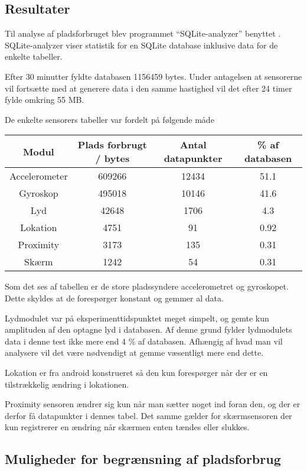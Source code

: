 \subsection{Resultater}
Til analyse af pladsforbruget blev programmet ``SQLite-analyzer'' benyttet \cite{sqliteanalyzer}.
SQLite-analyzer viser statistik for en SQLite database inklusive data for de enkelte tabeller.

Efter 30 minutter fyldte databasen 1156459 bytes.
Under antagelsen at sensorerne vil fortsætte med at generere data i den samme hastighed vil det efter 24 timer fylde omkring 55 MB. 

De enkelte sensorers tabeller var fordelt på følgende måde

\begin{tabular}{|c|c|c|c|}
	\hline Modul & Plads forbrugt / bytes & Antal datapunkter & \% af databasen \\
	\hline Accelerometer & 609266 & 12434 & 51.1 \\ 
	\hline Gyroskop & 495018 & 10146 & 41.6\\ 
	\hline Lyd & 42648 & 1706 & 4.3 \\ 
	\hline Lokation & 4751 & 91 & 0.92 \\ 
	\hline Proximity & 3173 & 135 & 0.31 \\ 
	\hline Skærm & 1242 & 54 & 0.31 \\ 
	\hline 
\end{tabular} 

Som det ses af tabellen er de store pladssyndere accelerometret og gyroskopet.
Dette skyldes at de forespørger konstant og gemmer al data.

Lydmodulet var på eksperimenttidspunktet meget simpelt, og gemte kun amplituden af den optagne lyd i databasen. 
Af denne grund fylder lydmodulets data i denne test ikke mere end 4 \% af databasen.
Afhængig af hvad man vil analysere vil det være nødvendigt at gemme væsentligt mere end dette.

Lokation er fra android konstrueret så den kun forespørger når der er en tilstrækkelig ændring i lokationen.

Proximity sensoren ændrer sig kun når man sætter noget ind foran den, og der er derfor få datapunkter i dennes tabel.
Det samme gælder for skærmsensoren der kun registrerer en ændring når skærmen enten tændes eller slukkes.	



\subsection{Muligheder for begrænsning af pladsforbrug}

